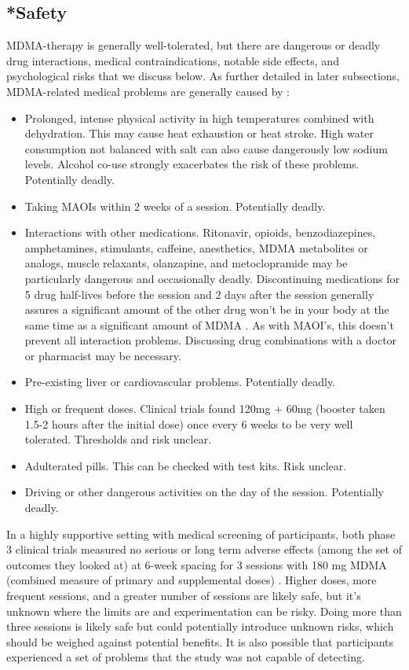 \documentclass[12pt,letterpaper]{article}
\begin{document}
\subsection{*Safety}
\label{sec:safety}
MDMA-therapy is generally well-tolerated, but there are dangerous or deadly drug interactions, medical contraindications, notable side effects, and psychological risks that we discuss below. As further detailed in later subsections, MDMA-related medical problems are generally caused by \cite{riggDeaths,roxburghDeaths}:
\begin{itemize}
    \item Prolonged, intense physical activity in high temperatures combined with dehydration. This may cause heat exhaustion or heat stroke. High water consumption not balanced with salt can also cause dangerously low sodium levels. Alcohol co-use strongly exacerbates the risk of these problems. Potentially deadly.
    \item Taking MAOIs within 2 weeks of a session. Potentially deadly.
    \item Interactions with other medications. Ritonavir, opioids, benzodiazepines, amphetamines, stimulants, caffeine, anesthetics, MDMA metabolites or analogs, muscle relaxants, olanzapine, and metoclopramide may be particularly dangerous and occasionally deadly. Discontinuing medications for 5 drug half-lives before the session and 2 days after the session generally assures a significant amount of the other drug won't be in your body at the same time as a significant amount of MDMA . As with MAOI's, this doesn't prevent all interaction problems. Discussing drug combinations with a doctor or pharmacist may be necessary.
    \item Pre-existing liver or cardiovascular problems. Potentially deadly.
    \item High or frequent doses. Clinical trials found 120mg + 60mg (booster taken 1.5-2 hours after the initial dose) once every 6 weeks to be very well tolerated. Thresholds and risk unclear.
    \item Adulterated pills. This can be checked with test kits. Risk unclear.
    \item Driving or other dangerous activities on the day of the session. Potentially deadly.
\end{itemize}

In a highly supportive setting with medical screening of participants, both phase 3 clinical trials measured no serious or long term adverse effects (among the set of outcomes they looked at) at 6-week spacing for 3 sessions with 180 mg MDMA (combined measure of primary and supplemental doses) \cite{mitchellMDMAClinicalTrial,mitchellMDMAClinicalTrial2}. Higher doses, more frequent sessions, and a greater number of sessions are likely safe, but it's unknown where the limits are and experimentation can be risky. Doing more than three sessions is likely safe but could potentially introduce unknown risks, which should be weighed against potential benefits. It is also possible that participants experienced a set of problems that the study was not capable of detecting.
\end{document}
